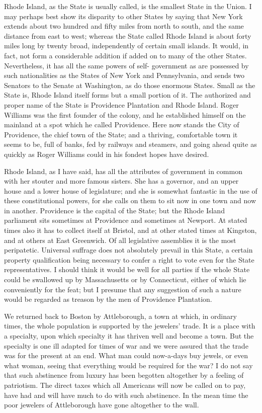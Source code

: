 Rhode Island, as the State is usually called, is the smallest State
in the Union.  I may perhaps best show its disparity to other
States by saying that New York extends about two hundred and fifty
miles from north to south, and the same distance from east to west;
whereas the State called Rhode Island is about forty miles long by
twenty broad, independently of certain small islands.  It would, in
fact, not form a considerable addition if added on to many of the
other States.  Nevertheless, it has all the same powers of self-
government as are possessed by such nationalities as the States of
New York and Pennsylvania, and sends two Senators to the Senate at
Washington, as do those enormous States.  Small as the State is,
Rhode Island itself forms but a small portion of it.  The
authorized and proper name of the State is Providence Plantation
and Rhode Island.  Roger Williams was the first founder of the
colony, and he established himself on the mainland at a spot which
he called Providence.  Here now stands the City of Providence, the
chief town of the State; and a thriving, comfortable town it seems
to be, full of banks, fed by railways and steamers, and going ahead
quite as quickly as Roger Williams could in his fondest hopes have
desired.

Rhode Island, as I have said, has all the attributes of government
in common with her stouter and more famous sisters.  She has a
governor, and an upper house and a lower house of legislature; and
she is somewhat fantastic in the use of these constitutional
powers, for she calls on them to sit now in one town and now in
another.  Providence is the capital of the State; but the Rhode
Island parliament sits sometimes at Providence and sometimes at
Newport.  At stated times also it has to collect itself at Bristol,
and at other stated times at Kingston, and at others at East
Greenwich.  Of all legislative assemblies it is the most
peripatetic.  Universal suffrage does not absolutely prevail in
this State, a certain property qualification being necessary to
confer a right to vote even for the State representatives.  I
should think it would be well for all parties if the whole State
could be swallowed up by Massachusetts or by Connecticut, either of
which lie conveniently for the feat; but I presume that any
suggestion of such a nature would be regarded as treason by the men
of Providence Plantation.

We returned back to Boston by Attleborough, a town at which, in
ordinary times, the whole population is supported by the jewelers'
trade.  It is a place with a specialty, upon which specialty it has
thriven well and become a town.  But the specialty is one ill
adapted for times of war and we were assured that the trade was for
the present at an end.  What man could now-a-days buy jewels, or
even what woman, seeing that everything would be required for the
war?  I do not say that such abstinence from luxury has been
begotten altogether by a feeling of patriotism.  The direct taxes
which all Americans will now be called on to pay, have had and will
have much to do with such abstinence.  In the mean time the poor
jewelers of Attleborough have gone altogether to the wall.



